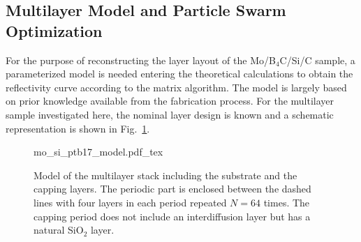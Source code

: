 \subsection{Multilayer Model and Particle Swarm Optimization}
For the purpose of reconstructing the layer layout of the Mo/B$_4$C/Si/C sample, a parameterized model is needed entering the theoretical calculations to obtain the reflectivity curve according to the matrix algorithm. The model is largely based on prior knowledge available from the fabrication process. For the multilayer sample investigated here, the nominal layer design is known and a schematic representation is shown in Fig.~\ref{ch_spec:fig_Mo_B4C_Si_C_model}.
\begin{figure}[htbp]
    \def\svgwidth{0.7\textwidth}
    \selectfont\footnotesize
    {mo_si_ptb17_model.pdf_tex}
    \caption{Model of the multilayer stack including the substrate and the capping layers. The periodic part is enclosed between the dashed lines with four layers in each period repeated $N=64$ times. The capping period does not include an interdiffusion layer but has a natural SiO$_2$ layer.}
    \label{ch_spec:fig_Mo_B4C_Si_C_model}
\end{figure}
